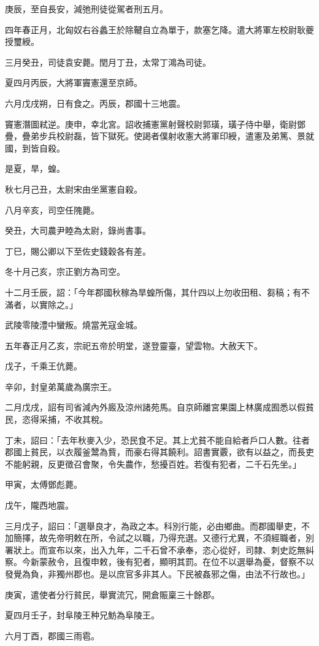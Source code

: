 \begin{pinyinscope}
庚辰，至自長安，減弛刑徒從駕者刑五月。

四年春正月，北匈奴右谷蠡王於除鞬自立為單于，款塞乞降。遣大將軍左校尉耿夔授璽綬。

三月癸丑，司徒袁安薨。閏月丁丑，太常丁鴻為司徒。

夏四月丙辰，大將軍竇憲還至京師。

六月戊戌朔，日有食之。丙辰，郡國十三地震。

竇憲潛圖弒逆。庚申，幸北宮。詔收捕憲黨射聲校尉郭璜，璜子侍中舉，衛尉鄧疊，疊弟步兵校尉磊，皆下獄死。使謁者僕射收憲大將軍印綬，遣憲及弟篤、景就國，到皆自殺。

是夏，旱，蝗。

秋七月己丑，太尉宋由坐黨憲自殺。

八月辛亥，司空任隗薨。

癸丑，大司農尹睦為太尉，錄尚書事。

丁巳，賜公卿以下至佐史錢穀各有差。

冬十月己亥，宗正劉方為司空。

十二月壬辰，詔：「今年郡國秋稼為旱蝗所傷，其什四以上勿收田租、芻稿；有不滿者，以實除之。」

武陵零陵澧中蠻叛。燒當羌寇金城。

五年春正月乙亥，宗祀五帝於明堂，遂登靈臺，望雲物。大赦天下。

戊子，千乘王伉薨。

辛卯，封皇弟萬歲為廣宗王。

二月戊戌，詔有司省減內外廄及涼州諸苑馬。自京師離宮果園上林廣成囿悉以假貧民，恣得采捕，不收其稅。

丁未，詔曰：「去年秋麥入少，恐民食不足。其上尤貧不能自給者戶口人數。往者郡國上貧民，以衣履釜鬵為貲，而豪右得其饒利。詔書實覈，欲有以益之，而長吏不能躬親，反更徵召會聚，令失農作，愁擾百姓。若復有犯者，二千石先坐。」

甲寅，太傅鄧彪薨。

戊午，隴西地震。

三月戊子，詔曰：「選舉良才，為政之本。科別行能，必由鄉曲。而郡國舉吏，不加簡擇，故先帝明敕在所，令試之以職，乃得充選。又德行尤異，不須經職者，別署狀上。而宣布以來，出入九年，二千石曾不承奉，恣心從好，司隸、刺史訖無糾察。今新蒙赦令，且復申敕，後有犯者，顯明其罰。在位不以選舉為憂，督察不以發覺為負，非獨州郡也。是以庶官多非其人。下民被姦邪之傷，由法不行故也。」

庚寅，遣使者分行貧民，舉實流冗，開倉賑稟三十餘郡。

夏四月壬子，封阜陵王种兄魴為阜陵王。

六月丁酉，郡國三雨雹。


\end{pinyinscope}
